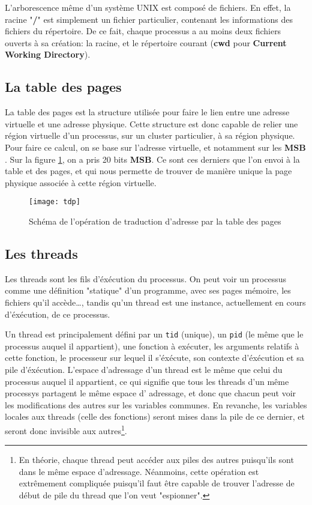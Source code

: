     L'arborescence même d'un système UNIX est composé de fichiers. En effet, la
    racine "\textbf{/}" est simplement un fichier particulier, contenant les
    informations des fichiers du répertoire. De ce fait, chaque processus a au
    moins deux fichiers ouverts à sa création: la racine, et le répertoire
    courant (\textbf{cwd} pour \textbf{Current Working Directory}).

  \subsection{La table des pages}

    La table des pages est la structure utilisée pour faire le lien entre une
    adresse virtuelle et une adresse physique. Cette structure est donc capable
    de relier une région virtuelle d'un processus, sur un cluster particulier, à
    sa région physique. Pour faire ce calcul, on se base sur l'adresse
    virtuelle, et notamment sur les \textbf{MSB} . Sur la figure \ref{fig:tdp},
    on a pris 20 bits \textbf{MSB}. Ce sont ces derniers que l'on envoi à la
    table et des pages, et qui nous permette de trouver de manière unique la
    page physique associée à cette région virtuelle.
  
    \begin{figure}[!h]
            
        \centering \texttt{[image: tdp]} \caption{Schéma de
        l'opération de traduction d'adresse par la table des pages}
        \label{fig:tdp}
    
    \end{figure}


  \subsection{Les threads}

    Les threads sont les fils d'éxécution du processus. On peut voir un
    processus comme une définition "statique" d'un programme, avec ses pages
    mémoire, les fichiers qu'il accède\ldots, tandis qu'un thread est une
    instance, actuellement en cours d'éxécution, de ce processus.
    
    Un thread est principalement défini par un \texttt{tid} (unique), un
    \texttt{pid} (le même que le processus auquel il appartient), une fonction à
    exécuter, les arguments relatifs à cette fonction, le processeur sur lequel
    il s'éxécute, son contexte d'éxécution et sa pile d'éxécution. L'espace
    d'adressage d'un thread est le même que celui du processus auquel il
    appartient, ce qui signifie que tous les threads d'un même processys
    partagent le même espace d' adressage, et donc que chacun peut voir les
    modifications des autres sur les variables communes. En revanche, les
    variables locales aux threads (celle des fonctions) seront mises dans la
    pile de ce dernier, et seront donc invisible aux autres\footnote{En théorie,
      chaque thread peut accéder aux piles des autres puisqu'ils sont dans le
      même espace d'adressage.  Néanmoins, cette opération est extrêmement
      compliquée puisqu'il faut être capable de trouver l'adresse de début de
    pile du thread que l'on veut "espionner".}.
    
